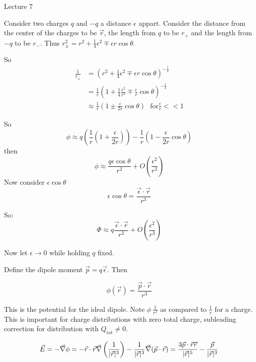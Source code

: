 \begin{center}

Lecture 7

\end{center}

Consider two charges $q$ and $-q$ a distance $\epsilon$ appart. Consider the distance from the center of the charges to be $\vec{r}$, the length from $q$ to be $r_{+}$ and the length from $-q$ to be $r_{-}$. Thus $r_{\pm}^2 = r^2 + \frac{1}{4} \epsilon^2 \mp \epsilon r \cos \theta$.

So
\begin{align*}
\frac{1}{r_{\pm}} &= \left(r^2 + \frac{1}{4} \epsilon^2 \mp \epsilon r \cos \theta\right)^{-\frac{1}{2}} \\
&= \frac{1}{r} \left(1 + \frac{1}{4}\frac{\epsilon^2}{r^2} \mp \frac{\epsilon}{r} \cos \theta\right)^{-\frac{1}{2}} \\
&\approx \frac{1}{r} \left(1 \pm \frac{\epsilon}{2r}\cos \theta\right) \,\, \, \, \text{for} \frac{\epsilon}{r} << 1
\end{align*}

So $$\phi \approx q \left(\frac{1}{r} \left(1 + \frac{\epsilon}{2r}\right) \right) - \frac{1}{r} \left(1 - \frac{\epsilon}{2r} \cos \theta\right)$$ then $$\phi \approx \frac{q\epsilon \cos \theta}{r^2} + O\left(\frac{\epsilon^2}{r^3}\right)$$ Now consider $\epsilon \cos \theta$ $$\epsilon \cos \theta = \frac{\vec{\epsilon} \cdot \vec{r}}{r^3}$$

So: $$\Phi \approx q \frac{\vec{\epsilon} \cdot \vec{r}}{r^3} + O\left(\frac{\epsilon^2}{r^3}\right)$$

Now let $\epsilon \rightarrow 0$ while holding $q$ fixed.

Define the dipole moment $\vec{p} = q \vec{\epsilon}$. Then 

\begin{equation}
\phi(\vec{r}) = \frac{\vec{p}\cdot \vec{r}}{r^3}
\end{equation}

This is the potential for the ideal dipole. Note $\phi ~ \frac{1}{r^2}$ as compared to $\frac{1}{r}$ for a charge. This is important for charge distributions with zero total charge, subleading correction for distribution with $Q_{\text{tot}} \neq 0$.

$$\vec{E} = - \vec{\nabla} \phi = - \vec{r} \cdot \vec{r} \vec{\nabla} \left(\frac{1}{|\vec{r}|^3}\right) - \frac{1}{|\vec{r}|^3} \vec{\nabla} (\vec{p} \cdot \vec{r}) = \frac{3 \vec{p} \cdot \vec{r} \vec{r}}{|\vec{r}|^5} - \frac{\vec{p}}{|\vec{r}|^3}$$

